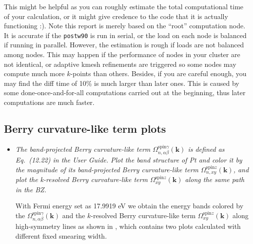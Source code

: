 \begin{itemize}
\begin{tcolorbox}[title=Pt.wpout,sharp corners,boxrule=0.5pt]
{\begin{verbatim}
\end{verbatim}
}
\end{tcolorbox}
This might be helpful as you can roughly 
estimate the total computational time 
of your calculation, or it might give credence to the code that it is actually functioning :). 
Note this report is merely based on the ``root'' computation node. It is accurate if the {\tt postw90} is run in serial, or the load on each node is balanced if running in parallel. However, the estimation is rough if loads are not balanced among nodes. This may happen if the performance of nodes in your cluster are not identical, or adaptive kmesh refinements are triggered so some nodes may compute much more $k$-points than others. 
Besides, if you are careful enough, you may find the diff time of 10\% is much larger than later ones. This 
is caused by some done-once-and-for-all computations carried out at the beginning, thus 
later computations are much faster. 
\end{itemize}

\subsection*{Berry curvature-like term plots}
\begin{itemize}
	\item {\it The band-projected Berry curvature-like term $\Omega_{n,\alpha\beta}^{\text{spin} \gamma}({\bm k})$ 
		is defined as Eq.~(12.22) in the User Guide.}
	{\it Plot the band structure of Pt and color it 
		by the magnitude of its band-projected Berry curvature-like term $\Omega_{n,xy}^{\text{spin}z}(\bm k)$, 
		and plot the k-resolved Berry curvature-like term $\Omega_{xy}^{\text{spin}z}(\bm k)$ along the 
		same path in the BZ. }
	
	With Fermi energy set as 17.9919 eV we obtain the energy bands colored by the 
	$\Omega_{n,\alpha\beta}^{\text{spin} \gamma}({\bm k})$ 
	and the $k$-resolved Berry curvature-like term 
	$\Omega_{xy}^{\text{spin}z}(\bm k)$ along high-symmetry lines 
	as shown in , which contains two plots calculated with 
	different fixed smearing width.
\end{itemize}

